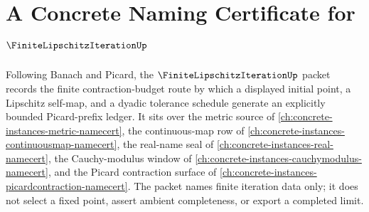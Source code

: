 \chapter{A Concrete Naming Certificate for $\FiniteLipschitzIterationUp$}
\label{ch:concrete-instances-finite-lipschitz-iteration-namecert}

Following Banach and Picard, the $\FiniteLipschitzIterationUp$ packet records the finite contraction-budget route by which a displayed initial point, a Lipschitz self-map, and a dyadic tolerance schedule generate an explicitly bounded Picard-prefix ledger. It sits over the metric source of \autoref{ch:concrete-instances-metric-namecert}, the continuous-map row of \autoref{ch:concrete-instances-continuousmap-namecert}, the real-name seal of \autoref{ch:concrete-instances-real-namecert}, the Cauchy-modulus window of \autoref{ch:concrete-instances-cauchymodulus-namecert}, and the Picard contraction surface of \autoref{ch:concrete-instances-picardcontraction-namecert}. The packet names finite iteration data only; it does not select a fixed point, assert ambient completeness, or export a completed limit.

